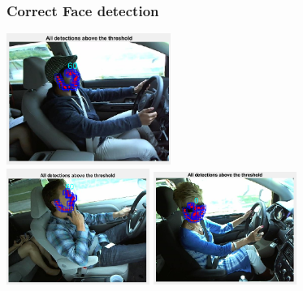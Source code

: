 \documentclass{beamer}
\begin{document}
	\begin{frame}
		\frametitle{Correct Face detection}
		\begin{center}
			\includegraphics[width=0.4\textwidth]{faces/face1} \\ \vspace{0.1cm}
			\includegraphics[width=0.35\textwidth]{faces/face4} \hspace{0.1cm}
			\includegraphics[width=0.35\textwidth]{faces/face6}
		\end{center}		
	\end{frame}
\end{document}
